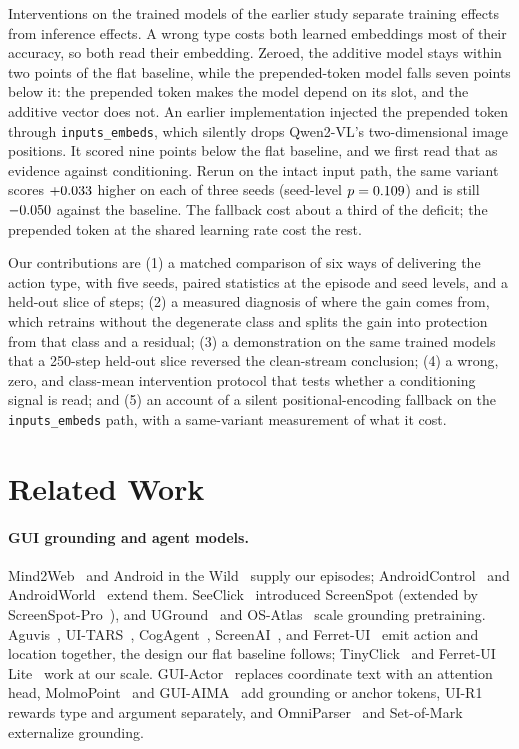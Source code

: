 \documentclass[letterpaper]{article} %
\begin{document}
Interventions on the trained models of the earlier study separate training effects from inference effects. A wrong type costs both learned embeddings most of their accuracy, so both read their embedding. Zeroed, the additive model stays within two points of the flat baseline, while the prepended-token model falls seven points below it: the prepended token makes the model depend on its slot, and the additive vector does not. An earlier implementation injected the prepended token through \texttt{inputs\_embeds}, which silently drops Qwen2-VL's two-dimensional image positions. It scored nine points below the flat baseline, and we first read that as evidence against conditioning. Rerun on the intact input path, the same variant scores $+0.033$ higher on each of three seeds (seed-level $p = 0.109$) and is still $-0.050$ against the baseline. The fallback cost about a third of the deficit; the prepended token at the shared learning rate cost the rest.

Our contributions are (1) a matched comparison of six ways of delivering the action type, with five seeds, paired statistics at the episode and seed levels, and a held-out slice of \nSliceN{} steps; (2) a measured diagnosis of where the gain comes from, which retrains without the degenerate class and splits the gain into protection from that class and a residual; (3) a demonstration on the same trained models that a 250-step held-out slice reversed the clean-stream conclusion; (4) a wrong, zero, and class-mean intervention protocol that tests whether a conditioning signal is read; and (5) an account of a silent positional-encoding fallback on the \texttt{inputs\_embeds} path, with a same-variant measurement of what it cost.

\section{Related Work}
\label{sec:related}

\paragraph{GUI grounding and agent models.}
Mind2Web~\citep{mind2web} and Android in the Wild~\citep{aitw} supply our episodes; AndroidControl~\citep{androidcontrol} and AndroidWorld~\citep{androidworld} extend them. SeeClick~\citep{seeclick} introduced ScreenSpot (extended by ScreenSpot-Pro~\citep{screenspotpro}), and UGround~\citep{uground} and OS-Atlas~\citep{osatlas} scale grounding pretraining. Aguvis~\citep{aguvis}, UI-TARS~\citep{uitars}, CogAgent~\citep{cogagent}, ScreenAI~\citep{screenai}, and Ferret-UI~\citep{ferretui} emit action and location together, the design our flat baseline follows; TinyClick~\citep{tinyclick} and Ferret-UI Lite~\citep{ferretuilite} work at our scale. GUI-Actor~\citep{guiactor} replaces coordinate text with an attention head, MolmoPoint~\citep{molmopoint} and GUI-AIMA~\citep{guiaima} add grounding or anchor tokens, UI-R1~\citep{uir1} rewards type and argument separately, and OmniParser~\citep{omniparser} and Set-of-Mark~\citep{som} externalize grounding.
\end{document}
